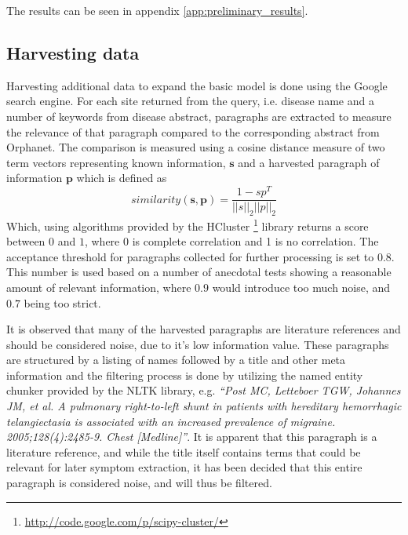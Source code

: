 \documentclass[10pt,letterpaper,final]{article}
\begin{document}
The results can be seen in appendix
\ref{app:preliminary_results}.


\subsection{Harvesting data}
Harvesting additional data to expand the basic model is done using the
Google search engine. For each site returned from the query, i.e.
disease name and a number of keywords from disease abstract, paragraphs
are extracted to measure the relevance of that paragraph compared to the
corresponding abstract from Orphanet. The comparison is measured using a
cosine distance measure of two term vectors representing known
information, $\textbf{s}$ and a harvested paragraph of information
$\textbf{p}$ which is defined as
\[
similarity(\textbf{s}, \textbf{p}) = \frac{1 - sp^T}{||s||_2 ||p||_2}
\]
Which, using algorithms provided by the HCluster
\footnote{\url{http://code.google.com/p/scipy-cluster/}} library returns
a score between $0$ and $1$, where 0 is complete correlation and 1 is
no correlation. The acceptance threshold for paragraphs collected for
further processing is set to $0.8$. This number is used based on a
number of anecdotal tests showing a reasonable amount of relevant
information, where $0.9$ would introduce too much noise, and $0.7$ being
too strict.

It is observed that many of the harvested paragraphs are literature
references and should be considered noise, due to it's low information
value.
These paragraphs are structured by a listing of names followed by a
title and other meta information and the filtering process is done by
utilizing the named entity chunker provided by the NLTK library, e.g.
\textit{``Post MC, Letteboer TGW, Johannes JM, et al. A pulmonary
right-to-left shunt in patients with hereditary hemorrhagic
telangiectasia is associated with an increased prevalence of migraine.
2005;128(4):2485-9. Chest [Medline]''}. It is apparent that this paragraph
is a literature reference, and while the title itself contains terms
that could be relevant for later symptom extraction, it has been decided
that this entire paragraph is considered noise, and will thus be
filtered.



\end{document}
